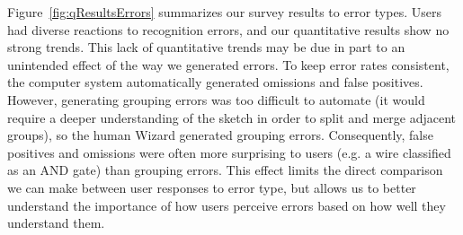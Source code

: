 \documentclass{elsart}
\begin{document}





Figure~\ref{fig:qResultsErrors} summarizes our survey results to error
types.  Users had diverse reactions to recognition errors, and our
quantitative results show no strong trends.  This lack of quantitative
trends may be due in part to an unintended effect of the way we
generated errors.  To keep error rates consistent, the computer system
automatically generated omissions and false positives.  However,
generating grouping errors was too difficult to automate (it would
require a deeper understanding of the sketch in order to split and
merge adjacent groups), so the human Wizard generated grouping errors.
Consequently, false positives and omissions were often more surprising
to users (e.g. a wire classified as an AND gate) than grouping errors.
This effect limits the direct comparison we can make between user
responses to error type, but allows us to better understand the
importance of how users perceive errors based on how well they
understand them.
\end{document}
